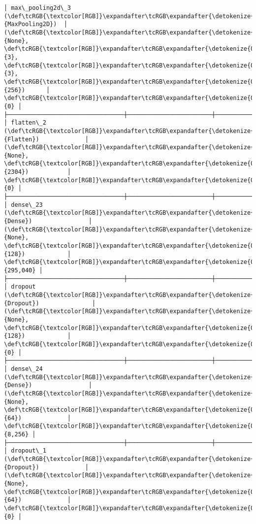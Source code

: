 \documentclass[12pt letter]{report}
\begin{document}
\begin{Verbatim}[commandchars=\\\{\}]
│ max\_pooling2d\_3 (\def\tcRGB{\textcolor[RGB]}\expandafter\tcRGB\expandafter{\detokenize{0,135,255}}{MaxPooling2D})  │ (\def\tcRGB{\textcolor[RGB]}\expandafter\tcRGB\expandafter{\detokenize{0,215,255}}{None}, \def\tcRGB{\textcolor[RGB]}\expandafter\tcRGB\expandafter{\detokenize{0,175,0}}{3}, \def\tcRGB{\textcolor[RGB]}\expandafter\tcRGB\expandafter{\detokenize{0,175,0}}{3}, \def\tcRGB{\textcolor[RGB]}\expandafter\tcRGB\expandafter{\detokenize{0,175,0}}{256})      │             \def\tcRGB{\textcolor[RGB]}\expandafter\tcRGB\expandafter{\detokenize{0,175,0}}{0} │
├─────────────────────────────────┼────────────────────────┼───────────────┤
│ flatten\_2 (\def\tcRGB{\textcolor[RGB]}\expandafter\tcRGB\expandafter{\detokenize{0,135,255}}{Flatten})             │ (\def\tcRGB{\textcolor[RGB]}\expandafter\tcRGB\expandafter{\detokenize{0,215,255}}{None}, \def\tcRGB{\textcolor[RGB]}\expandafter\tcRGB\expandafter{\detokenize{0,175,0}}{2304})           │             \def\tcRGB{\textcolor[RGB]}\expandafter\tcRGB\expandafter{\detokenize{0,175,0}}{0} │
├─────────────────────────────────┼────────────────────────┼───────────────┤
│ dense\_23 (\def\tcRGB{\textcolor[RGB]}\expandafter\tcRGB\expandafter{\detokenize{0,135,255}}{Dense})                │ (\def\tcRGB{\textcolor[RGB]}\expandafter\tcRGB\expandafter{\detokenize{0,215,255}}{None}, \def\tcRGB{\textcolor[RGB]}\expandafter\tcRGB\expandafter{\detokenize{0,175,0}}{128})            │       \def\tcRGB{\textcolor[RGB]}\expandafter\tcRGB\expandafter{\detokenize{0,175,0}}{295,040} │
├─────────────────────────────────┼────────────────────────┼───────────────┤
│ dropout (\def\tcRGB{\textcolor[RGB]}\expandafter\tcRGB\expandafter{\detokenize{0,135,255}}{Dropout})               │ (\def\tcRGB{\textcolor[RGB]}\expandafter\tcRGB\expandafter{\detokenize{0,215,255}}{None}, \def\tcRGB{\textcolor[RGB]}\expandafter\tcRGB\expandafter{\detokenize{0,175,0}}{128})            │             \def\tcRGB{\textcolor[RGB]}\expandafter\tcRGB\expandafter{\detokenize{0,175,0}}{0} │
├─────────────────────────────────┼────────────────────────┼───────────────┤
│ dense\_24 (\def\tcRGB{\textcolor[RGB]}\expandafter\tcRGB\expandafter{\detokenize{0,135,255}}{Dense})                │ (\def\tcRGB{\textcolor[RGB]}\expandafter\tcRGB\expandafter{\detokenize{0,215,255}}{None}, \def\tcRGB{\textcolor[RGB]}\expandafter\tcRGB\expandafter{\detokenize{0,175,0}}{64})             │         \def\tcRGB{\textcolor[RGB]}\expandafter\tcRGB\expandafter{\detokenize{0,175,0}}{8,256} │
├─────────────────────────────────┼────────────────────────┼───────────────┤
│ dropout\_1 (\def\tcRGB{\textcolor[RGB]}\expandafter\tcRGB\expandafter{\detokenize{0,135,255}}{Dropout})             │ (\def\tcRGB{\textcolor[RGB]}\expandafter\tcRGB\expandafter{\detokenize{0,215,255}}{None}, \def\tcRGB{\textcolor[RGB]}\expandafter\tcRGB\expandafter{\detokenize{0,175,0}}{64})             │             \def\tcRGB{\textcolor[RGB]}\expandafter\tcRGB\expandafter{\detokenize{0,175,0}}{0} │

\end{Verbatim}
\end{document}
